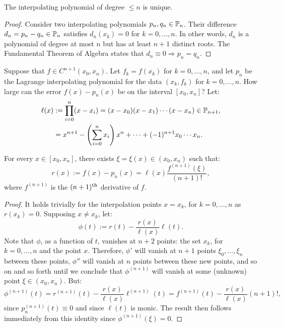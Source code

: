 \begin{theorem}\label{theorem:polyuniqueness}
The interpolating polynomial of degree $\le n$ is unique.
\end{theorem}
\begin{proof}
Consider two interpolating polynomials $p_n,q_n\in\P_n$. Their difference $d_n=p_n-q_n\in\P_n$ satisfies $d_n(x_k) = 0$ for $k=0,\ldots,n$. In other words, $d_n$ is a polynomial of degree at most $n$ but has at least $n+1$ distinct roots. The Fundamental Theorem of Algebra states that $d_n\equiv 0\Rightarrow p_n=q_n$.
\end{proof}

Suppose that $f\in C^{n+1}(x_0,x_n)$. Let $f_k = f(x_k)$ for $k=0,\ldots,n$, and let $p_n$ be the Lagrange interpolating polynomial for the data $(x_k,f_k)$ for $k=0,\ldots,n$. How large can the error $f(x)-p_n(x)$ be on the interval $[x_0,x_n]$? Let:
\begin{align}
\ell(x) & := \prod_{i=0}^n(x-x_i) = (x-x_0)(x-x_1)\cdots(x-x_n)\in\P_{n+1},\label{eq:Omega}\\
& = x^{n+1} - \pr(\sum_{i=0}^nx_i)x^n +\cdots+(-1)^{n+1}x_0\cdots x_n.\nonumber
\end{align}

\begin{theorem}\label{theorem:LagrangeInterpolatingRemainder}
For every $x\in[x_0,x_n]$, there exists $\xi = \xi(x) \in (x_0,x_n)$ such that:
\[
r(x) := f(x)-p_n(x) = \ell(x)\dfrac{f^{(n+1)}(\xi)}{(n+1)!},
\]
where $f^{(n+1)}$ is the $(n+1)^{\rm th}$ derivative of $f$.
\end{theorem}
\begin{proof}
It holds trivially for the interpolation points $x=x_k$, for $k=0,\ldots,n$ as $r(x_k) = 0$. Supposing $x\ne x_k$, let:
\[
\phi(t) := r(t) - \dfrac{r(x)}{\ell(x)}\ell(t).
\]
Note that $\phi$, as a function of $t$, vanishes at $n+2$ points: the set $x_k$, for $k=0,\ldots,n$ and the point $x$. Therefore, $\phi'$ will vanish at $n+1$ points $\xi_0,\ldots,\xi_n$ between these points, $\phi''$ will vanish at $n$ points between these new points, and so on and so forth until we conclude that $\phi^{(n+1)}$ will vanish at some (unknown) point $\xi\in(x_0,x_n)$. But:
\[
\phi^{(n+1)}(t) = r^{(n+1)}(t) - \dfrac{r(x)}{\ell(x)}\ell^{(n+1)}(t) = f^{(n+1)}(t) - \dfrac{r(x)}{\ell(x)}(n+1)!,
\]
since $p_n^{(n+1)}(t) \equiv 0$ and since $\ell(t)$ is monic. The result then follows immediately from this identity since $\phi^{(n+1)}(\xi) = 0$.
\end{proof}

